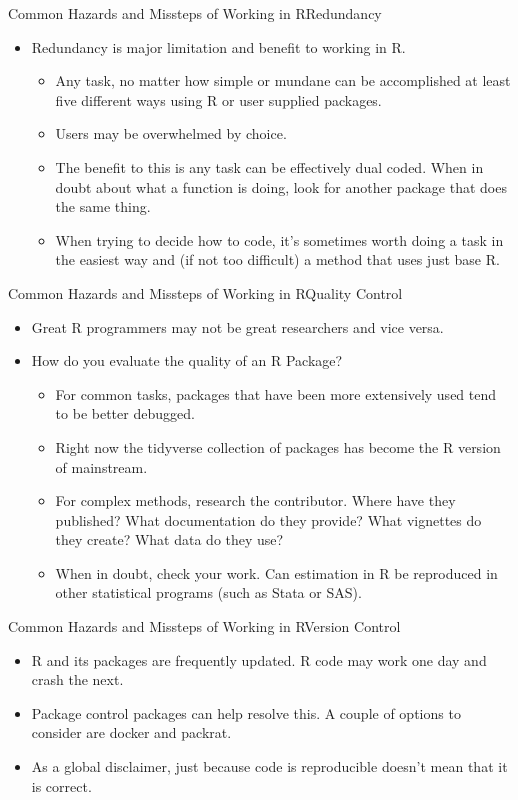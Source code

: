 \documentclass{beamer}
\begin{document}
\begin{frame}{Common Hazards and Missteps of Working in R}{Redundancy}
\begin{itemize}

    \item Redundancy is major limitation and benefit to working in R.
    \begin{itemize}
        \item Any task, no matter how simple or mundane can be accomplished at least five different ways using R or user supplied packages.
        \item Users may be overwhelmed by choice. 
        \item The benefit to this is any task can be effectively dual coded.  When in doubt about what a function is doing, look for another package that does the same thing.
        \item When trying to decide how to code, it's sometimes worth doing a task in the easiest way and (if not too difficult) a method that uses just base R.  
    \end{itemize}
\end{itemize}
\end{frame}

\begin{frame}{Common Hazards and Missteps of Working in R}{Quality Control}
\begin{itemize}
    \item Great R programmers may not be great researchers and vice versa.
    \item How do you evaluate the quality of an R Package?
    \begin{itemize}
        \item For common tasks, packages that have been more extensively used tend to be better debugged.  
        \item Right now the tidyverse collection of packages has  become the R version of mainstream.
        \item For complex methods, research the contributor.  Where have they published?  What documentation do they provide?  What vignettes do they create?  What data do they use?
        \item When in doubt, check your work.  Can estimation in R be reproduced in other statistical programs (such as Stata or SAS).  
    \end{itemize}
\end{itemize}
\end{frame}

\begin{frame}{Common Hazards and Missteps of Working in R}{Version Control}
\begin{itemize}
    \item R and its packages are frequently updated.  R code may work one day and crash the next.
    \item Package control packages can help resolve this.  A couple of options to consider are docker and packrat.
    \item As a global disclaimer, just because code is reproducible doesn't mean that it is correct.  
    
\end{itemize}
\end{frame}
\end{document}

